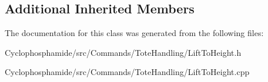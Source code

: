 \subsection*{Additional Inherited Members}


The documentation for this class was generated from the following files\+:\begin{DoxyCompactItemize}
\item 
Cyclophosphamide/src/\+Commands/\+Tote\+Handling/Lift\+To\+Height.\+h\item 
Cyclophosphamide/src/\+Commands/\+Tote\+Handling/Lift\+To\+Height.\+cpp\end{DoxyCompactItemize}
